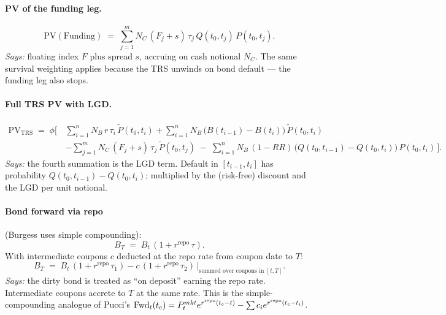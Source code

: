 \documentclass[11pt,a4paper]{article}
\begin{document}
\paragraph{PV of the funding leg.}
\begin{equation}\label{eq:btrs-funding}
  \mathrm{PV}(\text{Funding}) \;=\; \sum_{j=1}^{m} N_C\, (F_j + s)\, \tau_j\, Q(t_0, t_j)\, P(t_0, t_j).
\end{equation}
\textit{Says:} floating index $F$ plus spread $s$, accruing on cash
notional $N_C$. The same survival weighting applies because the TRS
unwinds on bond default --- the funding leg also stops.

\paragraph{Full TRS PV with LGD.}
\begin{equation}\label{eq:btrs-full}
  \begin{aligned}
  \mathrm{PV}_{\mathrm{TRS}} \;=\; \phi \biggl[\,
    & \sum_{i=1}^{n} N_B\, r\, \tau_i\, \widetilde P(t_0, t_i)
    + \sum_{i=1}^{n} N_B\, \bigl(B(t_{i-1}) - B(t_i)\bigr)\, \widetilde P(t_0, t_i) \\
    & - \sum_{j=1}^{m} N_C\, (F_j + s)\, \tau_j\, \widetilde P(t_0, t_j)
    \;-\; \sum_{i=1}^{n} N_B\, (1 - RR)\, \bigl(Q(t_0, t_{i-1}) - Q(t_0, t_i)\bigr)\, P(t_0, t_i)
  \,\biggr].
  \end{aligned}
\end{equation}
\textit{Says:} the fourth summation is the LGD term. Default in
$[t_{i-1}, t_i]$ has probability $Q(t_0, t_{i-1}) - Q(t_0, t_i)$;
multiplied by the (risk-free) discount and the LGD per unit notional.

\paragraph{Bond forward via repo} (Burgess uses simple compounding):
\begin{equation}\label{eq:btrs-fwd-noc}
  B_T \;=\; B_t\,(1 + r^{\text{repo}}\, \tau).
\end{equation}
With intermediate coupons $c$ deducted at the repo rate from coupon
date to $T$:
\begin{equation}\label{eq:btrs-fwd-coupon}
  B_T \;=\; B_t\,(1 + r^{\text{repo}}\, \tau_1) - c\,(1 + r^{\text{repo}}\, \tau_2)\, \big|_{\text{summed over coupons in } [t, T]}.
\end{equation}
\textit{Says:} the dirty bond is treated as ``on deposit'' earning
the repo rate. Intermediate coupons accrete to $T$ at the same rate.
This is the simple-compounding analogue of Pucci's
$\mathrm{Fwd}_t(t_e) = P^{mkt}_t e^{r^{\mathrm{repo}} (t_e - t)} - \sum c_i e^{r^{\mathrm{repo}} (t_e - t_i)}$.
\end{document}
